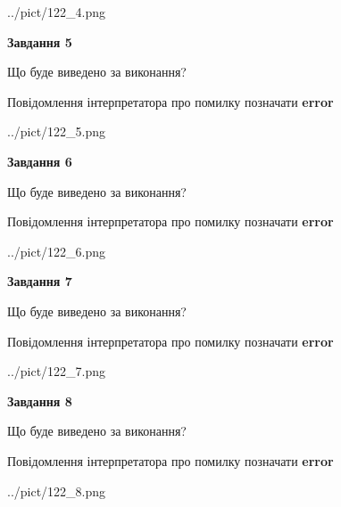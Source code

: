 \documentclass[12pt, ukrainian]{article}
\begin{document}
{\begin{center}
	{../pict/122_4.png}
\end{center}
\newpage

{\begin {center}\textbf{Завдання 5}\end {center}}\par
Що буде виведено за виконання? \par
Повідомлення інтерпретатора про помилку позначати \textbf{error}

\begin{center}
	{../pict/122_5.png}
\end{center}
\newpage

{\begin {center}\textbf{Завдання 6}\end {center}}\par
Що буде виведено за виконання? \par
Повідомлення інтерпретатора про помилку позначати \textbf{error}

\begin{center}
	{../pict/122_6.png}
\end{center}
\newpage

{\begin {center}\textbf{Завдання 7}\end {center}}\par
Що буде виведено за виконання? \par
Повідомлення інтерпретатора про помилку позначати \textbf{error}

\begin{center}
	{../pict/122_7.png}
\end{center}
\newpage

{\begin {center}\textbf{Завдання 8}\end {center}}\par
Що буде виведено за виконання? \par
Повідомлення інтерпретатора про помилку позначати \textbf{error}

\begin{center}
	{../pict/122_8.png}
\end{center}
\newpage

}
\end{document}
